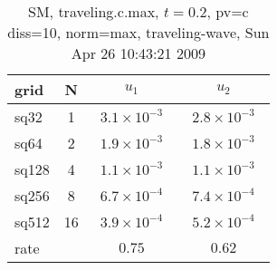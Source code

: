 \begin{table}[hbt]\tableFont %
\begin{center}
\begin{tabular}{|l|c|c|c|} \hline\hline 
grid  & N &  $u_1$ & $u_2$  \\ \hline 
                sq32 &     1 & ~$3.1\times10^{ -3}$~ & ~$2.8\times10^{ -3}$~  \\ \hline
                sq64 &     2 & ~$1.9\times10^{ -3}$~ & ~$1.8\times10^{ -3}$~  \\ \hline
               sq128 &     4 & ~$1.1\times10^{ -3}$~ & ~$1.1\times10^{ -3}$~  \\ \hline
               sq256 &     8 & ~$6.7\times10^{ -4}$~ & ~$7.4\times10^{ -4}$~  \\ \hline
               sq512 &    16 & ~$3.9\times10^{ -4}$~ & ~$5.2\times10^{ -4}$~  \\ \hline
    rate             &       &       $0.75$          &       $0.62$           \\ \hline\hline
\end{tabular}
\caption{SM, traveling.c.max, $t=0.2$,  pv=c diss=10, norm=max, traveling-wave, Sun Apr 26 10:43:21 2009}\label{table:traveling.c.max}
\end{center}
\end{table}
